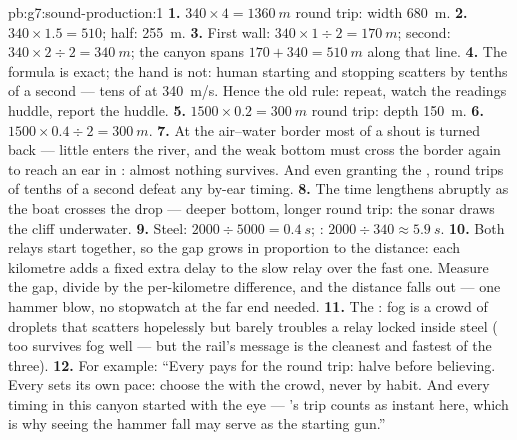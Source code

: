 \begin{solution}{pb:g7:sound-production:1}
\textbf{1.} $340 \times 4 = \qty{1360}{m}$ round trip: width
\qty{680}{m}.
\textbf{2.} $340 \times 1.5 = 510$; half: \qty{255}{m}.
\textbf{3.} First wall: $340 \times 1 \div 2 = \qty{170}{m}$;
second: $340 \times 2 \div 2 = \qty{340}{m}$; the canyon spans
$170 + 340 = \qty{510}{m}$ along that line.
\textbf{4.} The formula is exact; the hand is not: human
starting and stopping scatters by tenths of a second --- tens of
 at \qty{340}{m/s}. Hence the old rule: repeat, watch the
readings huddle, report the huddle.
\textbf{5.} $1500 \times 0.2 = \qty{300}{m}$ round trip: depth
\qty{150}{m}.
\textbf{6.} $1500 \times 0.4 \div 2 = \qty{300}{m}$.
\textbf{7.} At the air--water border most of a shout is turned
back --- little enters the river, and the weak bottom  must
cross the border again to reach an ear in : almost nothing
survives. And even granting the , round trips of tenths of a
second defeat any by-ear timing.
\textbf{8.} The  time lengthens abruptly as the boat crosses
the drop --- deeper bottom, longer round trip: the sonar draws
the cliff underwater.
\textbf{9.} Steel: $2000 \div 5000 = \qty{0.4}{s}$; : $2000
\div 340 \approx \qty{5.9}{s}$.
\textbf{10.} Both relays start together, so the gap grows in
proportion to the distance: each kilometre adds a fixed extra
delay to the slow relay over the fast one. Measure the gap,
divide by the per-kilometre difference, and the distance falls
out --- one hammer blow, no stopwatch at the far end needed.
\textbf{11.} The : fog is a crowd of droplets that
scatters \emph{} hopelessly but barely troubles a relay
locked inside  steel ( too survives fog well ---
but the rail's message is the cleanest and fastest of the
three).
\textbf{12.} For example: ``Every  pays for the round trip:
halve before believing. Every  sets its own pace: choose
the  with the crowd, never by habit. And every timing in
this canyon started with the eye --- 's trip counts as
instant here, which is why seeing the hammer fall may serve as
the starting gun.''
\end{solution}
